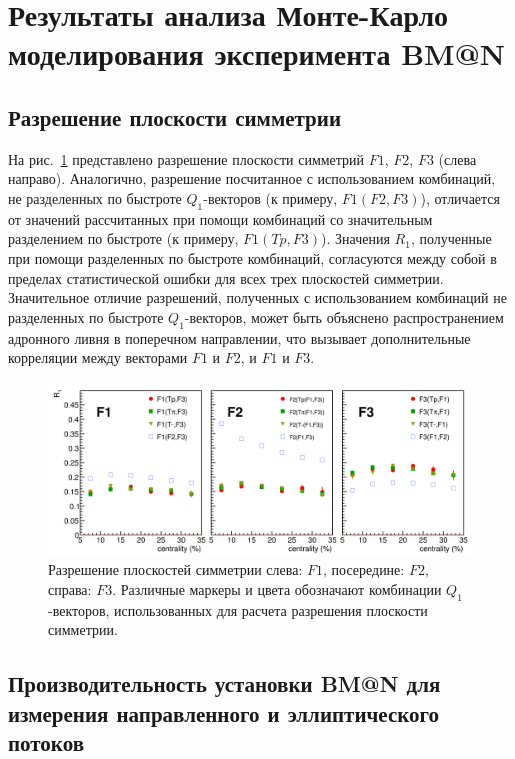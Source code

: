 \section{Результаты анализа Монте-Карло моделирования эксперимента BM@N}

\subsection{Разрешение плоскости симметрии}

На рис.~\ref{fig:bmn_combinations} представлено разрешение плоскости симметрий $F1$, $F2$, $F3$ (слева направо). 
Аналогично, разрешение посчитанное с использованием комбинаций, не разделенных по быстроте $Q_1$-векторов (к примеру, $F1(F2,F3)$), отличается от значений рассчитанных при помощи комбинаций со значительным разделением по быстроте (к примеру, $F1(Tp,F3)$).
Значения $R_1$, полученные при помощи разделенных по быстроте комбинаций, согласуются между собой в пределах статистической ошибки для всех трех плоскостей симметрии. 
Значительное отличие разрешений, полученных с использованием комбинаций не разделенных по быстроте $Q_1$-векторов, может быть объяснено распространением адронного ливня в поперечном направлении, что вызывает дополнительные корреляции между векторами $F1$ и $F2$, и $F1$ и $F3$.
%
\begin{figure}[ht]
\begin{center}
\includegraphics[width=0.95\linewidth]{images/R1_F123_combinations_centrality.png}
\caption{Разрешение плоскостей симметрии слева: $F1$, посередине: $F2$, справа: $F3$. Различные маркеры и цвета обозначают комбинации $Q_1$-векторов, использованных для расчета разрешения плоскости симметрии.}
\label{fig:bmn_combinations}
\end{center}
\end{figure}

\subsection{Производительность установки BM@N для измерения направленного и эллиптического потоков}

